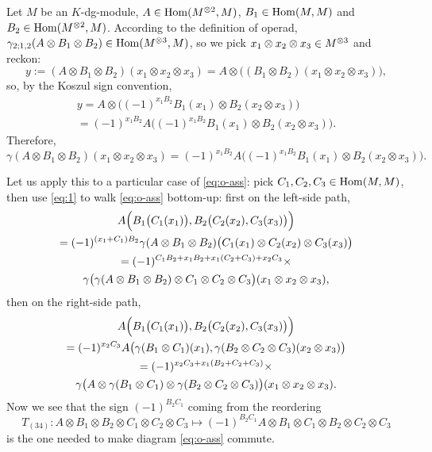Let $M$ be an $K$-dg-module, $A \in \operatorname{Hom}(M\sp{\otimes 2}, M)$, $B_1 \in
\operatorname{Hom}(M,M)$ and $B_2 \in \operatorname{Hom}(M\sp{\otimes 2}, M)$. According to the definition of
operad, $\gamma_{2; 1,2}(A \otimes B_1 \otimes B_2) \in \operatorname{Hom}(M\sp{\otimes 3}, M)$, so we pick
$x_1 \otimes x_2 \otimes x_3 \in M\sp{\otimes 3}$ and reckon:
\begin{equation*}
  y := (A \otimes B_1 \otimes B_2) (x_1 \otimes x_2 \otimes x_3) = A \otimes \bigl( (B_1 \otimes B_2)
  (x_1 \otimes x_2 \otimes x_3) \bigr),
\end{equation*}
so, by the Koszul sign convention,
\begin{multline*}
  y = A \otimes \bigl( (-1)^{x_1 B_2} B_1(x_1) \otimes B_2(x_2 \otimes x_3) \bigr) \\ 
  = (-1)^{x_1 B_2} A\bigl( (-1)^{x_1 B_2} B_1(x_1) \otimes B_2(x_2 \otimes x_3)
  \bigr).
\end{multline*}
Therefore,
\begin{equation}
  \label{eq:1}
  \gamma(A \otimes B_1 \otimes B_2) (x_1 \otimes x_2 \otimes x_3) = (-1)^{x_1B_2}  A\bigl( (-1)^{x_1 B_2} B_1(x_1) \otimes B_2(x_2 \otimes x_3) \bigr).
\end{equation}

Let us apply this to a particular case of \eqref{eq:o-ass}: pick $C_1,
C_2, C_3 \in \operatorname{Hom}(M,M)$, then use \eqref{eq:1} to walk \eqref{eq:o-ass}
bottom-up: first on the left-side path,
\begin{multline*}
  A\Bigl( B_1\bigl( C_1(x_1) \bigr), B_2\bigl(C_2(x_2), C_3(x_3)\bigr)
  \Bigr)  \\ = (-1)^{(x_1 + C_1)B_2} \gamma(A \otimes B_1 \otimes B_2) \bigl( C_1(x_1)
  \otimes C_2(x_2) \otimes C_3(x_3) \bigr)  \\ = (-1)^{C_1B_2 + x_1B_2 + x_1(C_2 +
    C_3) + x_2C_3}  \times \\ \gamma\bigl( \gamma(A \otimes B_1 \otimes B_2) \otimes C_1 \otimes C_2 \otimes C_3
  \bigr) (x_1 \otimes x_2 \otimes x_3),
\end{multline*}
then on the right-side path,
\begin{multline*}
  A\Bigl( B_1\bigl( C_1(x_1) \bigr), B_2\bigl(C_2(x_2), C_3(x_3)\bigr)
  \Bigr) \\ = (-1)^{x_2 C_3} A\bigl( \gamma(B_1 \otimes C_1) (x_1), \gamma(B_2 \otimes C_2
  \otimes C_3) (x_2 \otimes x_3) \bigr) \\ = (-1)^{x_2 C_3 + x_1(B_2 + C_2 + C_3)}
  \times \\ \gamma\bigl( A \otimes \gamma(B_1 \otimes C_1) \otimes \gamma(B_2 \otimes C_2 \otimes C_3) \bigr) (x_1 \otimes
  x_2 \otimes x_3).
\end{multline*}
Now we see that the sign $(-1)^{B_2C_1}$ coming from the reordering
\begin{equation*}
T_{(34)}: A \otimes B_1 \otimes B_2 \otimes C_1 \otimes C_2 \otimes C_3 \mapsto (-1)^{B_2 C_1} A \otimes
B_1 \otimes C_1 \otimes B_2 \otimes C_2 \otimes C_3
\end{equation*}
is the one needed to make diagram \eqref{eq:o-ass} commute.


